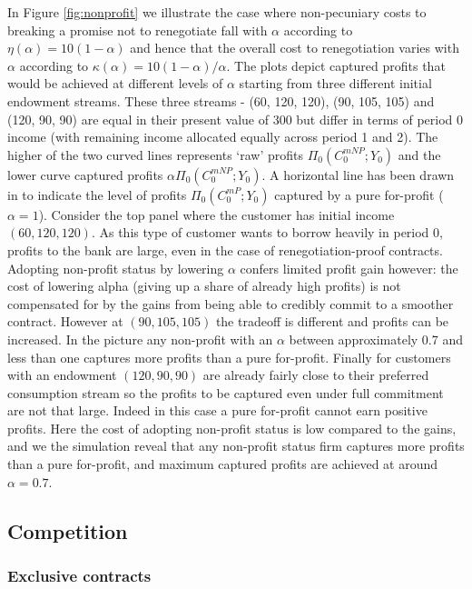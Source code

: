 \documentclass[11pt,english]{article}
\theoremstyle{plain}
\theoremstyle{definition}
\begin{document}
In Figure \ref{fig:nonprofit} we illustrate the case where non-pecuniary
costs to breaking a promise not to renegotiate fall with $\alpha$
according to $\eta(\alpha)=10(1-\alpha)$ and hence that the overall
cost to renegotiation varies with $\alpha$ according to $\kappa(\alpha)=10(1-\alpha)/\alpha$.
The plots depict captured profits that would be achieved at different
levels of $\alpha$ starting from three different initial endowment
streams. These three streams - (60, 120, 120), (90, 105, 105) and
(120, 90, 90) \textendash{} are equal in their present value of 300
but differ in terms of period 0 income (with remaining income allocated
equally across period 1 and 2). The higher of the two curved lines
represents `raw' profits $\Pi_{0}(C_{0}^{mNP};Y_{0})$ and the lower
curve captured profits $\alpha\Pi_{0}(C_{0}^{mNP};Y_{0})$. A horizontal
line has been drawn in to indicate the level of profits $\Pi_{0}(C_{0}^{mP};Y_{0})$
captured by a pure for-profit ($\alpha=1$). Consider the top panel
where the customer has initial income $(60,120,120)$. As this type
of customer wants to borrow heavily in period 0, profits to the bank
are large, even in the case of renegotiation-proof contracts. Adopting
non-profit status by lowering $\alpha$ confers limited profit gain
however: the cost of lowering alpha (giving up a share of already
high profits) is not compensated for by the gains from being able
to credibly commit to a smoother contract. However at $(90,105,105)$
the tradeoff is different and profits can be increased. In the picture
any non-profit with an $\alpha$ between approximately 0.7 and less
than one captures more profits than a pure for-profit. Finally for
customers with an endowment $(120,90,90)$ are already fairly close
to their preferred consumption stream so the profits to be captured
even under full commitment are not that large. Indeed in this case
a pure for-profit cannot earn positive profits. Here the cost of adopting
non-profit status is low compared to the gains, and we the simulation
reveal that any non-profit status firm captures more profits than
a pure for-profit, and maximum captured profits are achieved at around
$\alpha=0.7$.

\subsection{Competition}

\subsubsection{Exclusive contracts}
\end{document}
